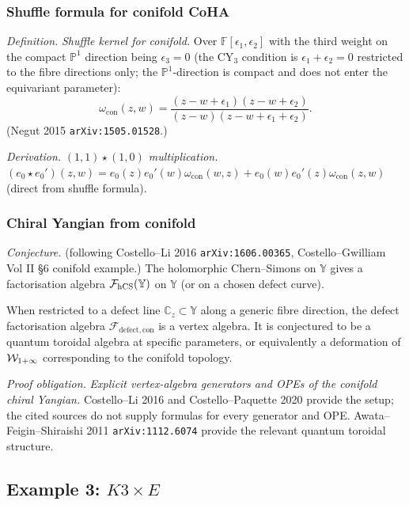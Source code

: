 \subsubsection{Shuffle formula for conifold CoHA}

\emph{Definition.} \emph{Shuffle kernel for conifold.}
Over $\mathbb{F}[\epsilon_1, \epsilon_2]$ with the third weight on the compact $\mathbb{P}^1$
direction being $\epsilon_3 = 0$ (the CY$_3$ condition is $\epsilon_1 + \epsilon_2 = 0$
restricted to the fibre directions only; the $\mathbb{P}^1$-direction is compact and does
not enter the equivariant parameter):
\[
\omega_{\mathrm{con}}(z, w) = \frac{(z - w + \epsilon_1)(z - w + \epsilon_2)}{(z - w)(z - w + \epsilon_1 + \epsilon_2)}.
\]
(Negut 2015 \texttt{arXiv:1505.01528}.)

\emph{Derivation.} \emph{$(1, 1) \star (1, 0)$ multiplication.}
$(e_0 \star e_0')(z, w) = e_0(z) e_0'(w) \omega_{\mathrm{con}}(w, z) + e_0(w) e_0'(z) \omega_{\mathrm{con}}(z, w)$
(direct from shuffle formula).

\subsubsection{Chiral Yangian from conifold}

\emph{Conjecture.} (following Costello--Li 2016 \texttt{arXiv:1606.00365},
Costello--Gwilliam Vol II §6 conifold example.)
The holomorphic Chern--Simons on $\mathbb{Y}$ gives a factorisation algebra
$\mathcal{F}_{\mathrm{hCS}}(\mathbb{Y})$ on $\mathbb{Y}$ (or on a chosen defect curve).

When restricted to a defect line $\mathbb{C}_z \subset \mathbb{Y}$ along a generic fibre
direction, the defect factorisation algebra $\mathcal{F}_{\mathrm{defect}, \mathrm{con}}$
is a vertex algebra. It is conjectured to be a quantum toroidal algebra at specific
parameters, or equivalently a deformation of $\mathcal{W}_{1+\infty}$ corresponding to the conifold
topology.

\emph{Proof obligation.} \emph{Explicit vertex-algebra generators and OPEs of the conifold
chiral Yangian.} Costello--Li 2016 and Costello--Paquette 2020 provide
the setup; the cited sources do not supply formulas for every generator
and OPE. Awata--Feigin--Shiraishi 2011
\texttt{arXiv:1112.6074} provide the relevant quantum toroidal structure.

\subsection{Example 3: $K3 \times E$}
\label{wn:subsec:K3xE}

